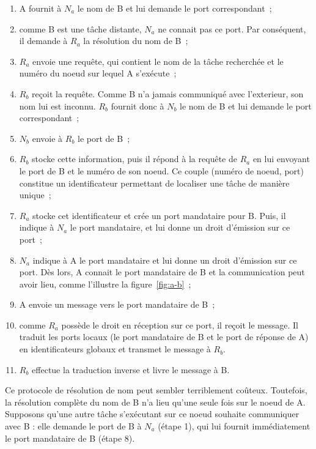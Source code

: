 \begin{enumerate}
\item A fournit \`a \(N_{a}\) le nom de B et lui demande le port correspondant~;
\item comme B est une t\^ache distante, \(N_{a}\) ne connait pas ce port. Par cons\'equent, il demande \`a \(R_{a}\) la r\'esolution du nom de B~;
\item \(R_{a}\) envoie une requ\^ete, qui contient le nom de la t\^ache recherch\'ee et le num\'ero du noeud sur lequel A s'ex\'ecute~;
\item \(R_{b}\) re\c{c}oit la requ\^ete. Comme B n'a jamais communiqu\'e avec l'exterieur, son nom lui est inconnu. \(R_{b}\) fournit donc \`a \(N_{b}\) le nom de B et lui demande le port correspondant~;
\item \(N_{b}\) envoie \`a \(R_{b}\) le port de B~;
\item \(R_{b}\) stocke cette information, puis il r\'epond \`a la requ\^ete de \(R_{a}\) en lui envoyant le port de B et le num\'ero de son noeud. Ce couple (num\'ero de noeud, port) constitue un identificateur permettant de localiser une t\^ache de mani\`ere unique~;
\item \(R_{a}\) stocke cet identificateur et cr\'ee un port mandataire pour B. Puis, il indique \`a \(N_{a}\) le port mandataire, et lui donne un droit d'\'emission sur ce port~;
\item \(N_{a}\) indique \`a A le port mandataire et lui donne un droit d'\'emission sur ce port. D\`es lors, A connait le 
port mandataire de B et la communication peut avoir lieu, comme l'illustre la figure~\ref{fig:a-b}~;


\item A envoie un message vers le port mandataire de B~;
\item comme \(R_{a}\) poss\`ede le droit en r\'eception sur ce port, il re\c{c}oit le
 message. Il traduit les ports locaux (le port mandataire de B et le port de r\'eponse de A) en identificateurs globaux et transmet le message \`a \(R_{b}\). 
\item \(R_{b}\) effectue la traduction inverse et livre le message \`a B.
\end{enumerate}

Ce protocole de r\'esolution de nom peut sembler terriblement co\^uteux. Toutefois, la r\'esolution compl\`ete du nom de B n'a lieu qu'une seule fois sur le noeud de A. Supposons qu'une autre t\^ache s'ex\'ecutant sur ce noeud souhaite communiquer avec B : elle demande le port de B \`a \(N_{a}\) (\'etape 1), qui lui fournit imm\'ediatement le port mandataire de B (\'etape 8). 

